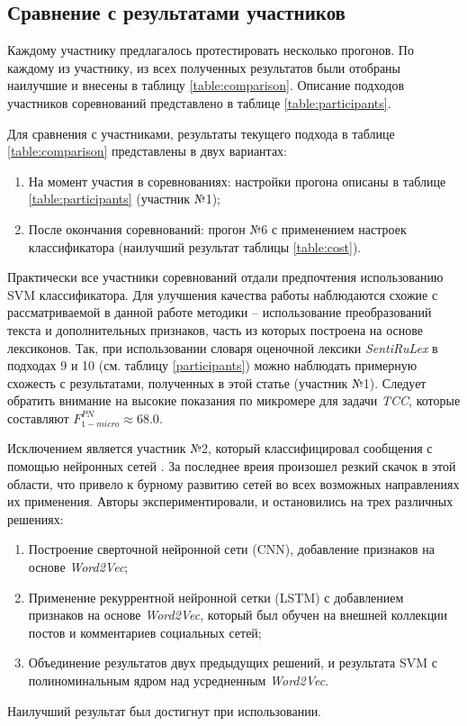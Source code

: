 \subsection{Сравнение с результатами участников}
Каждому участнику предлагалось протестировать несколько прогонов.
По каждому из участнику, из всех полученных результатов были отобраны
наилучшие и внесены в таблицу \ref{table:comparison}.
Описание подходов участников соревнований представлено в таблице
\ref{table:participants}.

Для сравнения с участниками, результаты текущего подхода в таблице
\ref{table:comparison} представлены в двух вариантах:

\begin{enumerate}
    \item На момент участия в соревнованиях: настройки прогона описаны
        в таблице \ref{table:participants} (участник №1);
    \item После окончания соревнований: прогон №6 с применением настроек
        классификатора (наилучший результат таблицы \ref{table:cost}).
\end{enumerate}


Практически все участники соревнований отдали предпочтения использованию
SVM классификатора.
Для улучшения качества работы наблюдаются схожие с рассматриваемой в данной
работе методики -- использование преобразований текста и
дополнительных признаков, часть из которых построена на основе лексиконов.
Так, при использовании словаря оценочной лексики {\it SentiRuLex} в подходах 9 и 10
(см. таблицу \ref{participants}) можно наблюдать примерную схожесть с результатами,
полученных в этой статье (участник №1).
Следует обратить внимание на высокие показания по микромере для задачи {\it TCC},
которые составляют  $F_{1-micro}^{PN} \approx 68.0$.

Исключением является участник №2, который классифицировал сообщения с помощью
нейронных сетей \cite{neuralNetworks}.
За последнее вреия произошел резкий скачок в этой области, что привело
к бурному развитию сетей во всех возможных направлениях их применения.
Авторы экспериментировали, и остановились на трех различных решениях:
\begin{enumerate}
    \item Построение сверточной нейронной сети (CNN), добавление признаков на
        основе {\it Word2Vec};
    \item Применение рекуррентной нейронной сетки (LSTM) с добавлением признаков
        на основе {\it Word2Vec}, который был обучен на внешней коллекции
        постов и комментариев социальных сетей;
    \item Объединение результатов двух предыдущих решений, и результата
        SVM с полиноминальным ядром над усредненным {\it Word2Vec}.
\end{enumerate}


Наилучший результат был достигнут при использовании.
